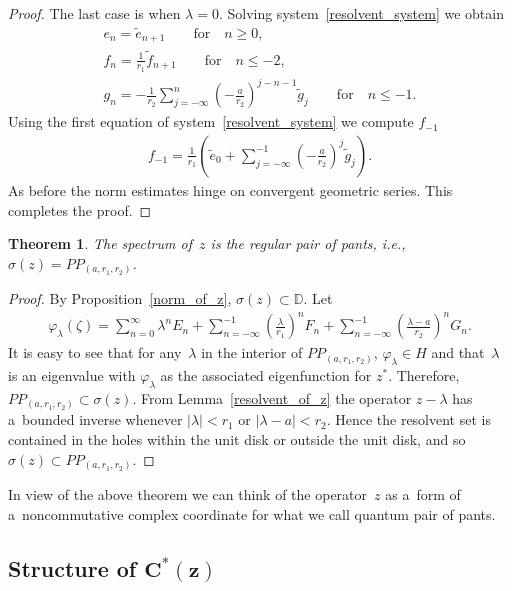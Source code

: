 \documentclass[pdftex]{sigma}
\numberwithin{equation}{section}
\newtheorem{Theorem}{Theorem}[section]
\begin{document}
\begin{proof}
The last case is when $\lambda=0$.
Solving system~\eqref{resolvent_system} we obtain
\begin{gather*}
e_n =\tilde{e}_{n+1} \qquad\text{for}\quad n\ge0,
\\
f_n =\frac{1}{r_1}\tilde{f}_{n+1} \qquad\text{for}\quad n\le-2,
\\
g_n =-\frac{1}{r_2}\sum\limits_{j=-\infty}^n\left(-\frac{a}{r_2}\right)^{j-n-1}\tilde{g}_j \qquad\text{for}\quad n\le-1.
\end{gather*}
Using the f\/irst equation of system~\eqref{resolvent_system} we compute $f_{-1}$
\begin{gather*}
f_{-1}=\frac{1}{r_1}\left(\tilde{e}_0+\sum\limits_{j=-\infty}^{-1}\left(-\frac{a}{r_2}\right)^j\tilde{g}_j\right).
\end{gather*}
As before the norm estimates hinge on convergent geometric series.
This completes the proof.
\end{proof}

\begin{Theorem}%
The spectrum of~$z$ is the regular pair of pants, i.e., $\sigma(z)=PP_{(a, r_1,r_2)}$.
\end{Theorem}

\begin{proof}
By Proposition~\ref{norm_of_z}, $\sigma(z)\subset {\mathbb D}$.
Let
\begin{gather*}
\varphi_\lambda(\zeta)=\sum\limits_{n=0}^\infty \lambda^nE_n+\sum\limits_{n=-\infty}^{-1}
\left(\frac{\lambda}{r_1}\right)^nF_n+\sum\limits_{n=-\infty}^{-1}\left(\frac{\lambda-a}{r_2}\right)^nG_n.
\end{gather*}
It is easy to see that for any~$\lambda$ in the interior of $PP_{(a, r_1,r_2)}$, $\varphi_\lambda\in H$ and
that~$\lambda$ is an eigenvalue with $\varphi_\lambda$ as the associated eigenfunction for $z^*$.
Therefore, $PP_{(a, r_1,r_2)}\subset\sigma(z)$.
From Lemma~\ref{resolvent_of_z} the operator $z-\lambda$ has a~bounded inverse whenever $|\lambda|< r_1$ or $|\lambda-a|<r_2$.
Hence the resolvent set is contained in the holes within the unit disk or outside the unit disk, and so
$\sigma(z)\subset PP_{(a, r_1,r_2)}$.
\end{proof}

In view of the above theorem we can think of the operator~$z$ as a~form of a~noncommutative complex coordinate for what
we call quantum pair of pants.

\subsection[Structure of $C^*(z)$]{Structure of $\boldsymbol{C^*(z)}$}
\end{document}
